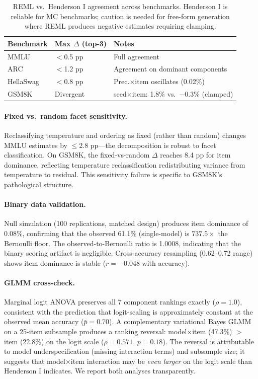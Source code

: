 \documentclass[11pt]{article}
\begin{document}
\begin{table}[t]
\centering
\caption{REML vs.\ Henderson I agreement across benchmarks. Henderson I is reliable for MC benchmarks; caution is needed for free-form generation where REML produces negative estimates requiring clamping.}
\label{tab:reml_henderson}
\small
\begin{tabular}{lll}
\toprule
\textbf{Benchmark} & \textbf{Max $\Delta$ (top-3)} & \textbf{Notes} \\
\midrule
MMLU      & $<$0.5 pp & Full agreement \\
ARC       & $<$1.2 pp & Agreement on dominant components \\
HellaSwag & $<$0.8 pp & Prec.$\times$item oscillates (0.02\%) \\
GSM8K     & Divergent  & seed$\times$item: 1.8\% vs.\ $-0.3\%$ (clamped) \\
\bottomrule
\end{tabular}
\end{table}

\paragraph{Fixed vs.\ random facet sensitivity.}
Reclassifying temperature and ordering as fixed (rather than random) changes MMLU estimates by $\leq$2.8 pp---the decomposition is robust to facet classification.
On GSM8K, the fixed-vs-random $\Delta$ reaches 8.4 pp for item dominance, reflecting temperature reclassification redistributing variance from temperature to residual.
This sensitivity failure is specific to GSM8K's pathological structure.

\paragraph{Binary data validation.}
Null simulation (100 replications, matched design) produces item dominance of 0.08\%, confirming that the observed 61.1\% (single-model) is $737.5\times$ the Bernoulli floor.
The observed-to-Bernoulli ratio is 1.0008, indicating that the binary scoring artifact is negligible.
Cross-accuracy resampling (0.62--0.72 range) shows item dominance is stable ($r = -0.048$ with accuracy).

\paragraph{GLMM cross-check.}
Marginal logit ANOVA preserves all 7 component rankings exactly ($\rho = 1.0$), consistent with the prediction that logit-scaling is approximately constant at the observed mean accuracy ($\bar{p} = 0.70$).
A complementary variational Bayes GLMM on a 25-item subsample produces a ranking reversal: model$\times$item (47.3\%) $>$ item (22.8\%) on the logit scale ($\rho = 0.571$, $p = 0.18$).
The reversal is attributable to model underspecification (missing interaction terms) and subsample size; it suggests that model$\times$item interaction may be \emph{even larger} on the logit scale than Henderson I indicates.
We report both analyses transparently.
\end{document}
